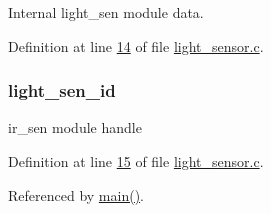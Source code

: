 Internal light\+\_\+sen module data. 



Definition at line \hyperlink{a00047_source_l00014}{14} of file \hyperlink{a00047_source}{light\+\_\+sensor.\+c}.

\hypertarget{a00047_a757e7771170ace1d9f8519bd318ec64a}{
\subsubsection[{light\+\_\+sen\+\_\+id}]{ light\+\_\+sen\+\_\+id}}\label{a00047_a757e7771170ace1d9f8519bd318ec64a}


ir\+\_\+sen module handle 



Definition at line \hyperlink{a00047_source_l00015}{15} of file \hyperlink{a00047_source}{light\+\_\+sensor.\+c}.



Referenced by \hyperlink{a00048_source_l00080}{main()}.

